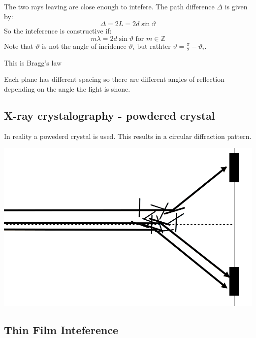 \documentclass{article}
\newcommand{\bb}[1]{\mathbb{#1}}
\begin{document}
The two rays leaving are close enough to intefere. The path difference \(\Delta\) is given by:
\[\Delta = 2L=2d\sin\vartheta\]
So the inteference is constructive if:
\[m\lambda=2d\sin\vartheta\text{ for }m\in\bb Z\]
Note that \(\vartheta\) is not the angle of incidence \(\vartheta_i\) but rathter \(\vartheta = \frac{\pi}{2}-\vartheta_i\).

This is Bragg's law

Each plane has different spacing so there are different angles of reflection depending on the angle the light is shone.

\subsection*{X-ray crystalography - powdered crystal}

In reality a powederd crystal is used. This results in a circular diffraction pattern.

\begin{center}
\includegraphics[scale=0.2]{CrystalPowder}
\end{center}

\subsection*{Thin Film Inteference}
\end{document}
